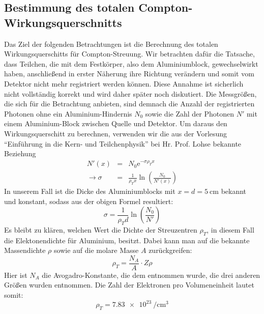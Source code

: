 \subsection{Bestimmung des totalen Compton-Wirkungsquerschnitts}
Das Ziel der folgenden Betrachtungen ist die Berechnung des totalen
Wirkungsquerschitts für Compton-Streuung. Wir betrachten dafür die Tatsache,
dass Teilchen, die mit dem Festkörper, also dem Aluminiumblock, gewechselwirkt
haben, anschließend in erster Näherung ihre Richtung verändern und somit vom
Detektor nicht mehr registriert werden können. Diese Annahme ist sicherlich
nicht vollständig korrekt und wird daher später noch diskutiert. Die
Messgrößen, die sich für die Betrachtung anbieten, sind demnach die Anzahl der
registrierten Photonen ohne ein Aluminium-Hindernis $N_0$ sowie die Zahl der
Photonen $N'$ mit einem Aluminium-Block zwischen Quelle und Detektor. Um daraus
den Wirkungsquerschitt zu berechnen, verwenden wir die aus der Vorlesung
``Einführung in die Kern- und Teilchenphysik'' bei Hr. Prof. Lohse bekannte
Beziehung
\begin{eqnarray}
  N'(x) &=& N_0 \mathrm e^{-\sigma \rho_T x}\\
\rightarrow \sigma &=& \frac{1}{\rho_T x}\ln\left(\frac{N_0}{N'(x)}\right)
\end{eqnarray}
In unserem Fall ist die Dicke des Aluminiumblocks mit $x = d =
\SI{5}{\centi\meter}$ bekannt und konstant, sodass aus der obigen Formel
resultiert:
\begin{equation}
  \sigma = \frac{1}{\rho_T d}\ln\left(\frac{N_0}{N'}\right)
\end{equation}
Es bleibt zu klären, welchen Wert die Dichte der Streuzentren $\rho_T$, in
diesem Fall die Elektonendichte für Aluminium, besitzt. Dabei kann man
auf die bekannte Massendichte $\rho$ sowie auf die molare Masse $A$
zurückgreifen:
\begin{equation}
  \rho_T = \frac{N_A}{A}\cdot Z\rho
\end{equation}
Hier ist $N_A$ die Avogadro-Konstante, die dem \cite{pdb} entnommen wurde, die
drei anderen Größen wurden \cite[Tab.2]{script} entnommen. Die Zahl der
Elektronen pro Volumeneinheit lautet somit:
\begin{equation}
  \rho_T = \SI{7,83e23}{\per\centi\meter\cubed}
\end{equation}

